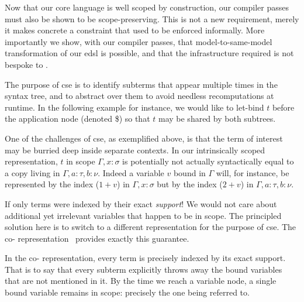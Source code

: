 
Now that our core language is well scoped by construction, our compiler passes
must also be shown to be scope-preserving.
%
This is not a new requirement, merely it makes concrete a constraint that
used to be enforced informally.
More importantly we show, with our compiler passes, that model-to-same-model transformation of our \ac{edsl} is possible, and that the infrastructure required is not bespoke to \Velo{}.

The purpose of \ac{cse} is to identify subterms that appear multiple times in the syntax tree, and to abstract over them to avoid needless recomputations at runtime.
%
In the following example for instance, we would like to let-bind $t$ before
the application node (denoted \$) so that $t$ may be shared by both subtrees.

\begin{center}
  \cseexamplegraph{}
\end{center}

One of the challenges of \ac{cse}, as exemplified above, is that the term of interest
may be burried deep inside separate contexts.
%
In our intrinsically scoped representation, $t$ in scope $\Gamma, x : \sigma$
is potentially not actually syntactically equal to a copy living in $\Gamma, a : \tau, b : \nu$.
%
Indeed a variable $v$ bound in $\Gamma$ will, for instance, be represented by
the \DeBruijn{} index ($1+v$) in $\Gamma, x : \sigma$
but by the index ($2+v$) in $\Gamma, a :  \tau, b : \nu$.

If only terms were indexed by their exact \emph{support}!
We would not care about additional yet irrelevant variables that happen to be in scope.
%
The principled solution here is to switch to a different representation for
the purpose of \ac{cse}.
The co-\DeBruijn{} representation~\cite{DBLP:journals/corr/abs-1807-04085} provides exactly this guarantee.


In the co-\DeBruijn{} representation, every term is precisely indexed by its
exact support.
%
That is to say that every subterm explicitly throws away the bound variables
that are not mentioned in it.
%
By the time we reach a variable node, a single bound variable remains in scope:
precisely the one being referred to.

